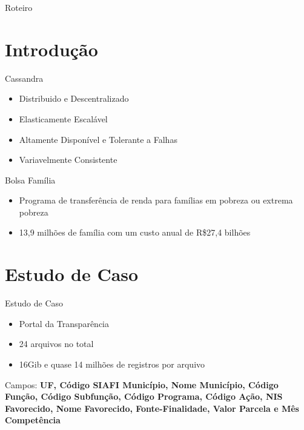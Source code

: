 
\begin{frame}
\titlepage
\end{frame}

\begin{frame}{Roteiro}
  \tableofcontents
\end{frame}

\section{Introdução}

\begin{frame}{Cassandra}
\begin{itemize}

\item Distribuido e Descentralizado
\item Elasticamente Escalável
\item Altamente Disponível e Tolerante a Falhas
\item Variavelmente Consistente

\end{itemize}
\end{frame}

\begin{frame}{Bolsa Família}
  \begin{itemize}
    \item Programa de transferência de renda para famílias em pobreza ou extrema pobreza
    \item 13,9 milhões de família com um custo anual de R\$27,4 bilhões 
  \end{itemize}
\end{frame}

\section{Estudo de Caso}
\begin{frame}{Estudo de Caso}
  \begin{itemize}
    \item Portal da Transparência
    \item 24 arquivos no total
    \item 16Gib e quase 14 milhões de registros por arquivo
\end{itemize}

Campos: \textbf{UF, Código SIAFI Município, Nome Município, Código Função, Código Subfunção, Código Programa, Código Ação, NIS Favorecido, Nome Favorecido, Fonte-Finalidade, Valor Parcela e Mês Competência}

\end{frame}

